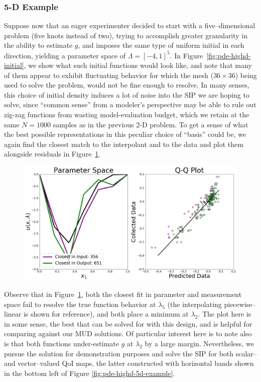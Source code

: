 \subsubsection{5-D Example}

Suppose now that an eager experimenter decided to start with a five--dimensional problem (five knots instead of two), trying to accomplish greater granularity in the ability to estimate $g$, and imposes the same type of uniform initial in each direction, yielding a parameter space of $\Lambda = [-4, 1]^5$.
In Figure~\ref{fig:pde-highd-initial}, we show what such initial functions would look like, and note that many of them appear to exhibit fluctuating behavior for which the mesh ($36\times36$) being used to solve the problem, would not be fine enough to resolve.
In many senses, this choice of initial density induces a lot of noise into the SIP we are hoping to solve, since ``common sense'' from a modeler's perspective may be able to rule out zig-zag functions from wasting model-evaluation budget, which we retain at the same $N=1000$ samples as in the previous 2-D problem.
To get a sense of what the best possible representations in this peculiar choice of ``basis'' could be, we again find the closest match to the interpolant and to the data and plot them alongside residuals in Figure~\ref{fig:pde-5d-proj}.

\begin{figure}[htbp]
\centering
  \includegraphics[width=0.675\linewidth]{figures/pde-highd/pde-highd_proj_D5}
\caption{
}
\label{fig:pde-5d-proj}
\end{figure}

Observe that in Figure~\ref{fig:pde-5d-proj}, both the closest fit in parameter and measurement space fail to resolve the true function behavior at $\lambda_5$ (the interpolating piecewise--linear is shown for reference), and both place a minimum at $\lambda_2$.
The plot here is in some sense, the best that can be solved for with this design, and is helpful for comparing against our MUD solutions.
Of particular interest here is to note also is that both functions under-estimate $g$ at $\lambda_2$ by a large margin.
Nevertheless, we pursue the solution for demonstration purposes and solve the SIP for both scalar-- and vector--valued QoI maps, the latter constructed with horizontal bands shown in the bottom left of Figure \ref{fig:pde-highd-5d-example}.

